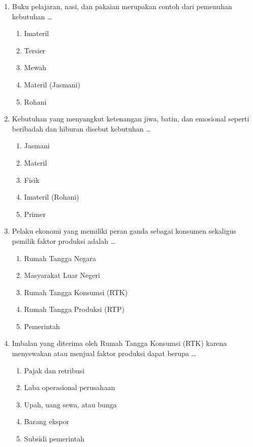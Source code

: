 \documentclass[12pt,a4paper]{article}
\begin{document}
\begin{enumerate}[leftmargin=*]
\item Buku pelajaran, nasi, dan pakaian merupakan contoh dari pemenuhan kebutuhan \dots
    \begin{enumerate}[label=\alph*.]
        \item Imateril
        \item Tersier
        \item Mewah
        \item Materil (Jasmani)
        \item Rohani
    \end{enumerate}

\item Kebutuhan yang menyangkut ketenangan jiwa, batin, dan emosional seperti beribadah dan hiburan disebut kebutuhan \dots
    \begin{enumerate}[label=\alph*.]
        \item Jasmani
        \item Materil
        \item Fisik
        \item Imateril (Rohani)
        \item Primer
    \end{enumerate}

\item Pelaku ekonomi yang memiliki peran ganda sebagai konsumen sekaligus pemilik faktor produksi adalah \dots
    \begin{enumerate}[label=\alph*.]
        \item Rumah Tangga Negara
        \item Masyarakat Luar Negeri
        \item Rumah Tangga Konsumsi (RTK)
        \item Rumah Tangga Produksi (RTP)
        \item Pemerintah
    \end{enumerate}

\item Imbalan yang diterima oleh Rumah Tangga Konsumsi (RTK) karena menyewakan atau menjual faktor produksi dapat berupa \dots
    \begin{enumerate}[label=\alph*.]
        \item Pajak dan retribusi
        \item Laba operasional perusahaan
        \item Upah, uang sewa, atau bunga
        \item Barang ekspor
        \item Subsidi pemerintah
    \end{enumerate}


\end{enumerate}
\end{document}
